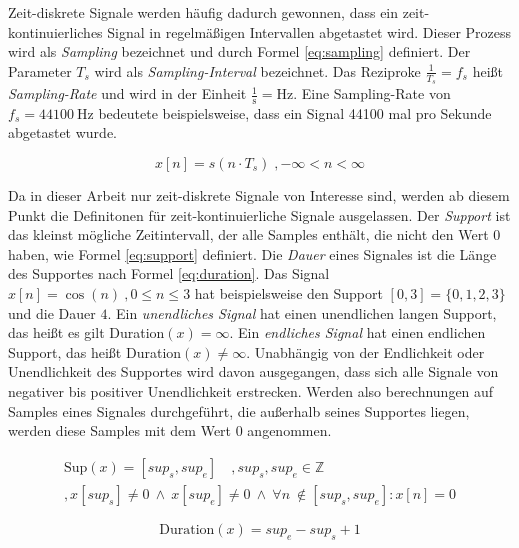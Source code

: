 Zeit-diskrete Signale werden häufig dadurch gewonnen, dass ein zeit-kontinuierliches Signal in regelmäßigen Intervallen abgetastet wird. Dieser Prozess wird als \emph{Sampling} bezeichnet und durch Formel \ref{eq:sampling} definiert. Der Parameter $T_s$ wird als \emph{Sampling-Interval} bezeichnet. Das Reziproke $\frac{1}{T_s} = f_s$ heißt \emph{Sampling-Rate} und wird in der Einheit $\frac{1}{\text{s}} = \text{Hz}$. Eine Sampling-Rate von $f_s = \SI{44100}{\hertz}$ bedeutete beispielsweise, dass ein Signal 44100 mal pro Sekunde abgetastet wurde.\cite[S. 24]{dspMichigan}

\begin{equation}
x[n] = s(n \cdot T_s) \; , -\infty < n < \infty
\label{eq:sampling}
\end{equation}
	
Da in dieser Arbeit nur zeit-diskrete Signale von Interesse sind, werden ab diesem Punkt die Definitonen für zeit-kontinuierliche Signale ausgelassen. Der \emph{Support} ist das kleinst mögliche Zeitintervall, der alle Samples enthält, die nicht den Wert 0 haben, wie Formel \ref{eq:support} definiert. Die \emph{Dauer} eines Signales ist die Länge des Supportes nach Formel \ref{eq:duration}. Das Signal $x[n] = \cos(n) \: ,0\leq n \leq 3$ hat beispielsweise den Support $[0,3] = \{0,1,2,3\} $ und die Dauer $4$. Ein \emph{unendliches Signal} hat einen unendlichen langen Support, das heißt es gilt Duration$(x) = \infty$. Ein \emph{endliches Signal} hat einen endlichen Support, das heißt Duration$(x) \neq\infty$. Unabhängig von der Endlichkeit oder Unendlichkeit des Supportes wird davon ausgegangen, dass sich alle Signale von negativer bis positiver Unendlichkeit erstrecken. Werden also berechnungen auf Samples eines Signales durchgeführt, die außerhalb seines Supportes liegen, werden diese Samples mit dem Wert 0 angenommen. \cite[S. 24]{dspMichigan}

\begin{equation}
\label{eq:support}
\begin{split}
\text{Sup}(x) = [sup_s, sup_e] \quad , sup_s, sup_e \in \mathbb{Z} \\,  x[sup_s] \neq 0 \:  \wedge \:  x[sup_e] \neq 0 \: \wedge \: \forall n \
\not\in [sup_s, sup_e] : x[n] = 0
\end{split}
\end{equation}

\begin{equation}
\text{Duration}(x) = sup_e - sup_s + 1
\label{eq:duration}
\end{equation}

